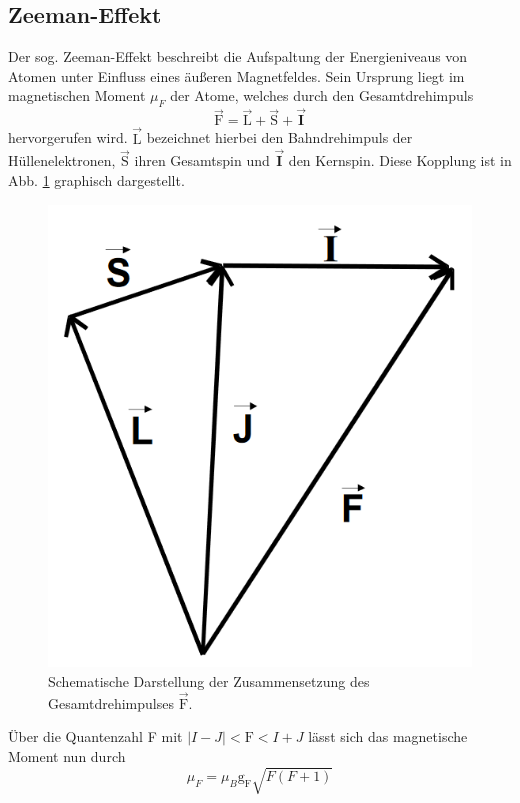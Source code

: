 \subsection{Zeeman-Effekt}
Der sog. Zeeman-Effekt beschreibt die Aufspaltung der Energieniveaus von Atomen unter Einfluss eines äußeren Magnetfeldes.
Sein Ursprung liegt im magnetischen Moment $\mu_F$ der Atome, welches durch den Gesamtdrehimpuls
\begin{equation}
  \vec{\text{F}}=\vec{\text{L}}+\vec{\text{S}}+\vec{\mathbf{I}}
  \label{eqn:F}
\end{equation}
hervorgerufen wird. $\vec{\text{L}}$ bezeichnet hierbei den Bahndrehimpuls der Hüllenelektronen, $\vec{\text{S}}$ ihren Gesamtspin und $\vec{\mathbf{I}}$ den Kernspin. Diese Kopplung ist in Abb. \ref{fig:F} graphisch dargestellt.
\begin{figure}[H]
  \centering
  \includegraphics{./Kopplung.PNG}
  \caption{Schematische Darstellung der Zusammensetzung des Gesamtdrehimpulses $\vec{\text{F}}$\cite{Anleitung}.}
  \label{fig:F}
\end{figure}
Über die Quantenzahl F mit $|I-J|<\text{F}<I+J$ lässt sich das magnetische Moment nun durch
\begin{equation}
  \mu_F = \mu_B \text{g}_\text{F} \sqrt{F(F+1)}
  \label{eqn:mu_F}
\end{equation}
